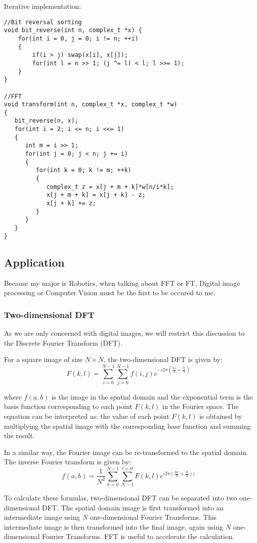 \documentclass[12pt,a4paper]{article}
\begin{document}
\newpage
Iterative implementation:
\lstset{language=C++}
\begin{lstlisting}
//Bit reversal sorting
void bit_reverse(int n, complex_t *x) {
	for(int i = 0, j = 0; i != n; ++i)
	{
		if(i > j) swap(x[i], x[j]);
		for(int l = n >> 1; (j ^= l) < l; l >>= 1);
	}
}

//FFT
void transform(int n, complex_t *x, complex_t *w) 
{
   bit_reverse(n, x);
   for(int i = 2; i <= n; i <<= 1)
   {
	  int m = i >> 1;
	  for(int j = 0; j < n; j += i)
	  {
		 for(int k = 0; k != m; ++k)
		 {
			complex_t z = x[j + m + k]*w[n/i*k];
			x[j + m + k] = x[j + k] - z;
			x[j + k] += z;
		 }
	  }
   }
}
\end{lstlisting} 

\subsection{Application}
Because my major is Robotics, when talking about FFT or FT, Digital image processing or Computer Vision must be the first to be occured to me.
\subsubsection{Two-dimensional DFT}
As we are only concerned with digital images, we will restrict this discussion to the Discrete Fourier Transform (DFT).

For a square image of size $N\times N$, the two-dimensional DFT is given by:
$$F(k,l)=\sum_{i=0}^{N-1} \sum_{j=0}^{N-1} f(i,j) e^{-\iota 2\pi (\frac{ki}{N}+\frac{lj}{N})}$$

where $f(a,b)$ is the image in the spatial domain and the exponential term is the basis function corresponding to each point $F(k,l)$ in the Fourier space. The equation can be interpreted as: the value of each point $F(k,l)$ is obtained by multiplying the spatial image with the corresponding base function and summing the result.

In a similar way, the Fourier image can be re-transformed to the spatial domain. The inverse Fourier transform is given by:
$$f(a,b)=\dfrac{1}{N^2}\sum^{N-1}_{k=0} \sum_{N-1}^{l=0} F(k,l) e^{\iota 2\pi (\frac{ka}{N}+\frac{lb}{N}))}$$

To calculate these formulas, two-dimensional DFT can be separated into two one-dimensional DFT. The spatial domain image is first transformed into an intermediate image using $N$ one-dimensional Fourier Transforms. This intermediate image is then transformed into the final image, again using $N$ one-dimensional Fourier Transforms. FFT is useful to accelerate the calculation.
\end{document}
